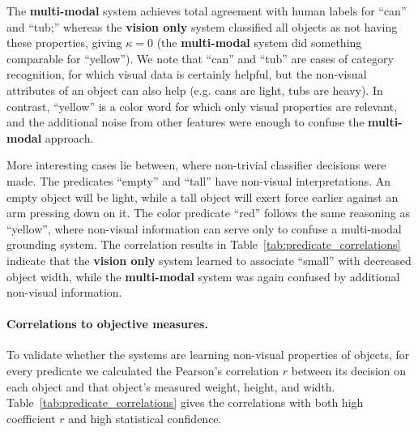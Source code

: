 The \textbf{multi-modal} system achieves total agreement with human labels for ``can'' and ``tub;''
whereas the \textbf{vision only} system classified all objects as not having these properties, giving $\kappa=0$ (the \textbf{multi-modal} system did something comparable for ``yellow'').
We note that ``can'' and ``tub'' are cases of category recognition, for which visual data is certainly helpful, but the non-visual attributes of an object can also help (e.g. cans are light, tubs are heavy).
In contrast, ``yellow'' is a color word for which only visual properties are relevant, and the additional noise from other features were enough to confuse the \textbf{multi-modal} approach.

More interesting cases lie between, where non-trivial classifier decisions were made.
The predicates ``empty'' and ``tall'' have non-visual interpretations.
An empty object will be light, while a tall object will exert force earlier against an arm pressing down on it.
The color predicate ``red'' follows the same reasoning as ``yellow'', where non-visual information can serve only to confuse a multi-modal grounding system.
The correlation results in Table~\ref{tab:predicate_correlations} indicate that the \textbf{vision only} system learned to associate ``small'' with decreased object width, while the \textbf{multi-modal} system was again confused by additional non-visual information.

\paragraph{Correlations to objective measures.}
To validate whether the systems are learning non-visual properties of objects, for every predicate we calculated the Pearson's correlation $r$ between its decision on each object and that object's measured weight, height, and width. Table~\ref{tab:predicate_correlations} gives the correlations with both high coefficient $r$ and high statistical confidence.


